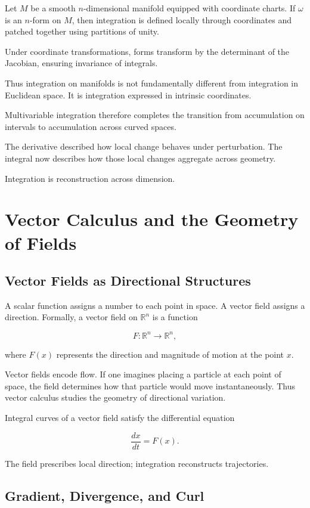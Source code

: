 \documentclass[12pt]{book}
\begin{document}
Let $M$ be a smooth $n$-dimensional manifold equipped with coordinate charts. If $\omega$ is an $n$-form on $M$, then integration is defined locally through coordinates and patched together using partitions of unity.

Under coordinate transformations, forms transform by the determinant of the Jacobian, ensuring invariance of integrals.

Thus integration on manifolds is not fundamentally different from integration in Euclidean space. It is integration expressed in intrinsic coordinates.

Multivariable integration therefore completes the transition from accumulation on intervals to accumulation across curved spaces.

The derivative described how local change behaves under perturbation. The integral now describes how those local changes aggregate across geometry.

Integration is reconstruction across dimension.

\chapter{Vector Calculus and the Geometry of Fields}

\section{Vector Fields as Directional Structures}

A scalar function assigns a number to each point in space. A vector field assigns a direction. Formally, a vector field on $\mathbb{R}^n$ is a function

\[
F : \mathbb{R}^n \to \mathbb{R}^n,
\]

where $F(x)$ represents the direction and magnitude of motion at the point $x$.

Vector fields encode flow. If one imagines placing a particle at each point of space, the field determines how that particle would move instantaneously. Thus vector calculus studies the geometry of directional variation.

Integral curves of a vector field satisfy the differential equation

\[
\frac{dx}{dt} = F(x).
\]

The field prescribes local direction; integration reconstructs trajectories.

\section{Gradient, Divergence, and Curl}
\end{document}
